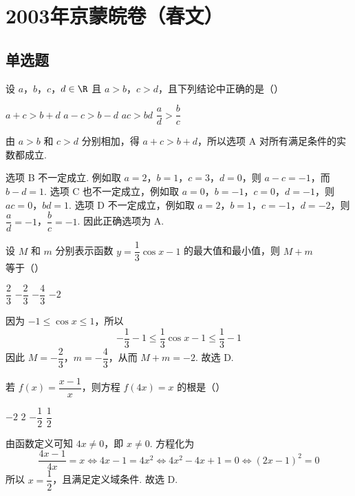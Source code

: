 \chapter{2003年京蒙皖卷（春文）}
\section{单选题}
\begin{problem}
设 \(a\)，\(b\)，\(c\)，\(d\in\R\) 且 \(a>b\)，\(c>d\)，且下列结论中正确的是（\quad）

\choices
    {\(a+c>b+d\)}
    {\(a-c>b-d\)}
    {\(ac>bd\)}
    {\(\dfrac{a}{d}>\dfrac{b}{c}\)}


\begin{solution}
由 \(a>b\) 和 \(c>d\) 分别相加，得 \(a+c>b+d\)，所以选项 A 对所有满足条件的实数都成立.

选项 B 不一定成立. 例如取 \(a=2\)，\(b=1\)，\(c=3\)，\(d=0\)，则 \(a-c=-1\)，而 \(b-d=1\). 选项 C 也不一定成立，例如取 \(a=0\)，\(b=-1\)，\(c=0\)，\(d=-1\)，则 \(ac=0\)，\(bd=1\). 选项 D 不一定成立，例如取 \(a=2\)，\(b=1\)，\(c=-1\)，\(d=-2\)，则 \(\dfrac{a}{d}=-1\)，\(\dfrac{b}{c}=-1\). 因此正确选项为 A.
\end{solution}
\end{problem}

\begin{problem}
设 \(M\) 和 \(m\) 分别表示函数 \(y=\dfrac{1}{3}\cos x-1\) 的最大值和最小值，则 \(M+m\) 等于（\quad）

\choices
    {\(\dfrac{2}{3}\)}
    {\(-\dfrac{2}{3}\)}
    {\(-\dfrac{4}{3}\)}
    {\(-2\)}


\begin{solution}
因为 \(-1\leqslant\cos x\leqslant1\)，所以
\[
-\dfrac{1}{3}-1\leqslant\dfrac{1}{3}\cos x-1\leqslant\dfrac{1}{3}-1
\]
因此 \(M=-\dfrac{2}{3}\)，\(m=-\dfrac{4}{3}\)，从而 \(M+m=-2\). 故选 D.
\end{solution}
\end{problem}

\begin{problem}
若 \(f(x)=\dfrac{x-1}{x}\)，则方程 \(f(4x)=x\) 的根是（\quad）

\choices
    {\(-2\)}
    {\(2\)}
    {\(-\dfrac{1}{2}\)}
    {\(\dfrac{1}{2}\)}


\begin{solution}
由函数定义可知 \(4x\neq0\)，即 \(x\neq0\). 方程化为
\[
\frac{4x-1}{4x}=x
\Longleftrightarrow 4x-1=4x^2
\Longleftrightarrow 4x^2-4x+1=0
\Longleftrightarrow (2x-1)^2=0
\]
所以 \(x=\dfrac{1}{2}\)，且满足定义域条件. 故选 D.
\end{solution}
\end{problem}

